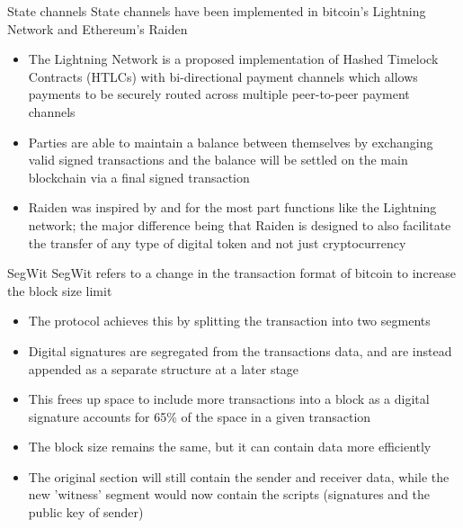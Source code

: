\documentclass[11pt]{beamer}
\begin{document}
\begin{frame}{State channels}
	State channels have been implemented in bitcoin's Lightning Network and Ethereum's Raiden
	\begin{itemize}
		\item The Lightning Network is a proposed implementation of Hashed Timelock Contracts (HTLCs) with bi-directional payment channels which allows payments to be securely routed across multiple peer-to-peer payment channels
		\item Parties are able to maintain a balance between themselves by exchanging valid signed transactions and the balance will be settled on the main blockchain via a final signed
		transaction
		\item Raiden was inspired by and for the most part functions like the Lightning network; the major difference being that Raiden is designed to also facilitate the transfer of any type of digital token and not just cryptocurrency
	\end{itemize}
\end{frame}


\begin{frame}{SegWit}
	SegWit refers to a change in the transaction format of bitcoin to increase the block size limit
	\begin{itemize}
		\item The protocol achieves this by splitting the transaction into two segments
		\item Digital signatures are segregated from the transactions data, and are instead appended as a separate structure at a later stage
		\item This frees up space to include more transactions into a block as a digital signature accounts for 65\% of the space in a given transaction
		\item The block size remains the same, but it can contain data more efficiently
		\item The original section will still contain the sender and receiver data, while the new 'witness' segment would now contain the scripts (signatures and the public key of sender)
	\end{itemize}
\end{frame}

\end{document}
